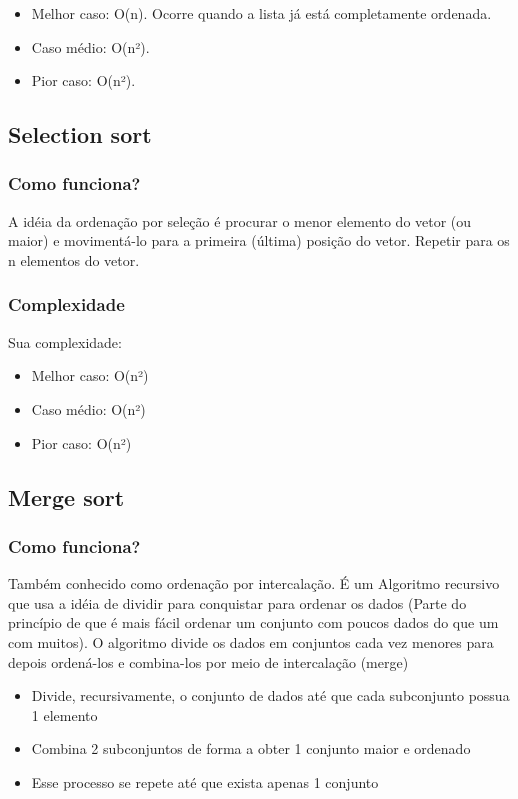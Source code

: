 \documentclass{report}
\begin{document}
	\begin{itemize}
		\item Melhor caso: O(n). Ocorre quando a lista já está completamente ordenada.
		\item Caso médio: O(n²).
		\item Pior caso: O(n²).
	\end{itemize}
	\subsection{Selection sort}
	\subsubsection{Como funciona?}
	A idéia da ordenação por seleção é
	procurar o menor elemento do
	vetor (ou maior) e movimentá-lo
	para a primeira (última) posição do
	vetor. Repetir para os n elementos do
	vetor.
	\subsubsection{Complexidade}
	Sua complexidade:
	
	\begin{itemize}
		\item Melhor caso: O(n²)
		\item Caso médio: O(n²)
		\item Pior caso: O(n²)
	\end{itemize}
	
	\subsection{Merge sort}
	\subsubsection{Como funciona?}
	
	Também conhecido como ordenação por intercalação. É um Algoritmo recursivo que usa a idéia de dividir para conquistar para
	ordenar os dados (Parte do princípio de que é mais fácil ordenar um conjunto com poucos dados do que um com muitos). O algoritmo divide os dados em conjuntos cada vez menores para depois ordená-los e combina-los por meio de intercalação (merge)
	
	\begin{itemize}
		\item Divide, recursivamente, o conjunto de dados até que cada subconjunto possua 1 elemento
		\item Combina 2 subconjuntos de forma a obter 1 conjunto maior e ordenado
		\item Esse processo se repete até que exista apenas 1 conjunto
	\end{itemize}
\end{document}

